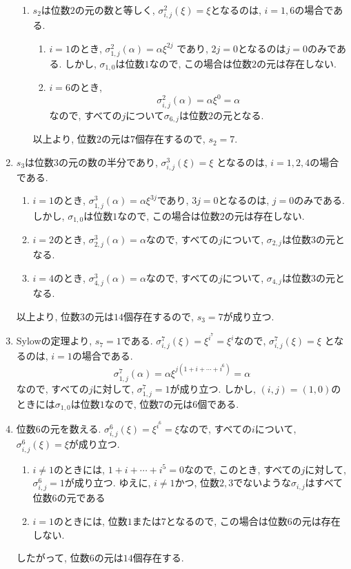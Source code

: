 \documentclass[dvipdfmx]{jsarticle}
\begin{document}
\begin{enumerate}
        \begin{enumerate}
            \item $s_2$は位数$2$の元の数と等しく,
            $\sigma_{i,j}^2(\xi) = \xi$となるのは, $i = 1,6$の場合である.
            \begin{enumerate}
                \item $i = 1$のとき, $\sigma_{1,j}^2(\alpha) = \alpha\xi^{2j}$
                であり, $2j = 0$となるのは$j = 0$のみである.
                しかし, $\sigma_{1,0}$は位数$1$なので, この場合は位数$2$の元は存在しない.
                \item $i = 6$のとき,
                \[
                    \sigma_{i,j}^2(\alpha) = \alpha\xi^{0} = \alpha
                \]
                なので, すべての$j$について$\sigma_{6,j}$は位数$2$の元となる.
            \end{enumerate}
            以上より, 位数$2$の元は$7$個存在するので, $s_2 = 7$.
        \end{enumerate}
        \item $s_3$は位数$3$の元の数の半分であり, $\sigma_{i,j}^{3}(\xi) = \xi$
        となるのは, $i = 1,2,4$の場合である.
        \begin{enumerate}
            \item $i = 1$のとき, $\sigma_{1,j}^3(\alpha) = \alpha\xi^{3j}$であり, $3j = 0$となるのは,
            $j = 0$のみである.
            しかし, $\sigma_{1,0}$は位数$1$なので, この場合は位数$2$の元は存在しない.
            \item $i = 2$のとき, $\sigma_{2,j}^3(\alpha) = \alpha$なので,
            すべての$j$について, $\sigma_{2,j}$は位数$3$の元となる.
            \item $i = 4$のとき, $\sigma_{4,j}^3(\alpha) = \alpha$なので,
            すべての$j$について, $\sigma_{4,j}$は位数$3$の元となる.
        \end{enumerate}
        以上より, 位数$3$の元は$14$個存在するので, $s_3 = 7$が成り立つ.
        \item Sylowの定理より, $s_7 = 1$である.
        $\sigma_{i,j}^7(\xi) = \xi^{i^7} = \xi^i$なので, $\sigma_{i,j}^7(\xi) = \xi$
        となるのは, $i = 1$の場合である.
        \[
            \sigma_{1,j}^7(\alpha) = \alpha\xi^{j(1+i+\cdots + i^{6})} = \alpha
        \]
        なので, すべての$j$に対して, $\sigma_{1,j}^7 = 1$が成り立つ.
        しかし, $(i,j) = (1,0)$のときには$\sigma_{1,0}$は位数$1$なので, 位数$7$の元は$6$個である.
        \item 位数$6$の元を数える.
        $\sigma_{i,j}^{6}(\xi) = \xi^{i^6} = \xi$なので,
        すべての$i$について, $\sigma_{i,j}^{6}(\xi) = \xi$が成り立つ.
        \begin{enumerate}
            \item $i \neq 1$のときには, $1 + i + \cdots + i^5 = 0$なので,
            このとき, すべての$j$に対して, $\sigma_{i,j}^6 = 1$が成り立つ.
            ゆえに, $i \neq 1$かつ, 位数$2,3$でないような$\sigma_{i,j}$はすべて位数$6$の元である
            \item $i = 1$のときには, 位数$1$または$7$となるので, この場合は位数$6$の元は存在しない.
        \end{enumerate}
        したがって, 位数$6$の元は$14$個存在する.


\end{enumerate}
\end{document}
